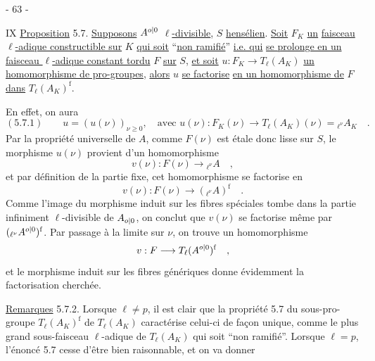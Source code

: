 \begin{center}- 63 -\end{center}
\hfill IX
\uline{Proposition} 5.7. \uline{Supposons} $A^{{o|0}}$ \uline{$\ell$-divisible}, $S$ \uline{hensélien}. \uline{Soit} $F_K$ \uline{un}
\uline{faisceau $\ell$-adique constructible sur} $K$ \uline{qui soit} ``\uline{non ramifié}'' \uline{i.e. qui}
\uline{se prolonge en un faisceau $\ell$-adique constant tordu} $F$ \uline{sur} $S$, \uline{et soit}
$u:F_K\longrightarrow T_\ell(A_K)$ \uline{un homomorphisme de pro-groupes}, \uline{alors} $u$ \uline{se factorise}
\uline{en un homomorphisme de} $F$ \uline{dans} $T_\ell(A_K)^{\mathrm f}$.

En effet, on aura
\[
(5.7.1)\qquad u=(u(\nu))_{\nu\geq0},\quad\text{avec }u(\nu):F_K(\nu)\longrightarrow T_\ell(A_K)(\nu)={}_{\ell^\nu}A_K\quad .
\]
Par la propriété universelle de $A$, comme $F(\nu)$ est étale donc lisse sur
$S$, le morphisme $u(\nu)$ provient d'un homomorphisme
\[
v(\nu):F(\nu)\longrightarrow{}_{\ell^\nu}A\quad ,
\]
et par définition de la partie fixe, cet homomorphisme se factorise en
\[
v(\nu):F(\nu)\longrightarrow({}_{\ell^\nu}A)^{\mathrm f}\quad .
\]
Comme l'image du morphisme induit sur les fibres spéciales tombe dans
la partie infiniment $\ell$-divisible de $A_{{o|0}}$, on conclut que $v(\nu)$ se factorise
même par $({}_{\ell^\nu}A^{{o|0}})^{\mathrm f}$. Par passage à la limite sur $\nu$, on trouve un homomorphisme
\[
v:F\longrightarrow T_\ell(A^{{o|0}})^{\mathrm f}\quad ,
\]
et le morphisme induit sur les fibres génériques donne évidemment la
factorisation cherchée.

\uline{Remarques} 5.7.2. Lorsque $\ell\ne p$, il est clair que la propriété 5.7 du
sous-pro-groupe $T_\ell(A_K)^{\mathrm f}$ de $T_\ell(A_K)$ caractérise celui-ci de façon unique,
comme le plus grand sous-faisceau $\ell$-adique de $T_\ell(A_K)$ qui soit ``non ramifié''.
Lorsque $\ell=p$, l'énoncé 5.7 cesse d'être bien raisonnable, et on va donner

